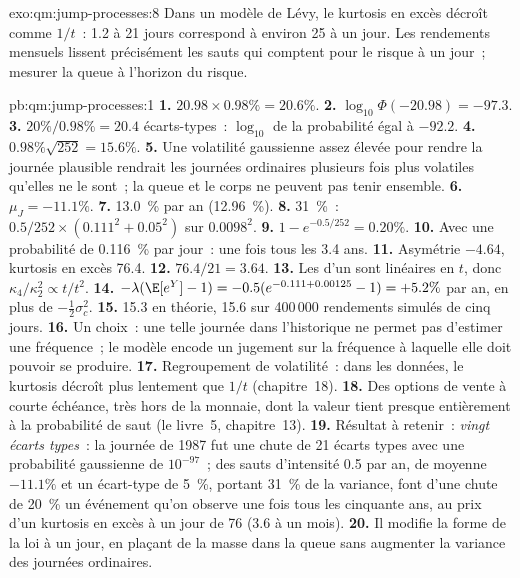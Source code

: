\begin{solution}{exo:qm:jump-processes:8}
Dans un modèle de Lévy, le kurtosis en excès décroît comme $1/t$~: 1.2 à 21 jours correspond à environ 25 à un jour.
Les rendements mensuels lissent précisément les sauts qui comptent pour le risque à un jour~; mesurer la queue à
l'horizon du risque.
\end{solution}

\begin{solution}{pb:qm:jump-processes:1}
\textbf{1.} $20.98 \times 0.98\% = 20.6\%$.
\textbf{2.} $\log_{10}\Phi(-20.98) = -97.3$.
\textbf{3.} $20\%/0.98\% = 20.4$ écarts-types~: $\log_{10}$ de la probabilité égal à $-92.2$.
\textbf{4.} $0.98\%\sqrt{252} = 15.6\%$.
\textbf{5.} Une volatilité gaussienne assez élevée pour rendre la journée plausible rendrait les journées ordinaires
plusieurs fois plus volatiles qu'elles ne le sont~; la queue et le corps ne peuvent pas tenir ensemble.
\textbf{6.} $\mu_J = -11.1\%$.
\textbf{7.} 13.0~\% par an (12.96~\%).
\textbf{8.} 31~\%~: $0.5/252 \times (0.111^2 + 0.05^2)$ sur $0.0098^2$.
\textbf{9.} $1 - e^{-0.5/252} = 0.20\%$.
\textbf{10.} Avec une probabilité de 0.116~\% par jour~: une fois tous les 3.4 ans.
\textbf{11.} Asymétrie $-4.64$, kurtosis en excès 76.4.
\textbf{12.} $76.4/21 = 3.64$.
\textbf{13.} Les  d'un  sont linéaires en $t$, donc $\kappa_4/\kappa_2^2 \propto t/t^2$.
\textbf{14.} $-\lambda(\E[e^Y] - 1) = -0.5(e^{-0.111 + 0.00125} - 1) = +5.2\%$ par an, en plus de $-\tfrac12\sigma_c^2$.
\textbf{15.} 15.3 en théorie, 15.6 sur 400\,000 rendements simulés de cinq jours.
\textbf{16.} Un choix~: une telle journée dans l'historique ne permet pas d'estimer une fréquence~; le modèle encode un
jugement sur la fréquence à laquelle elle doit pouvoir se produire.
\textbf{17.} Regroupement de volatilité~: dans les données, le kurtosis décroît plus lentement que $1/t$ (chapitre~18).
\textbf{18.} Des options de vente à courte échéance, très hors de la monnaie, dont la valeur tient presque entièrement à la probabilité de saut (le
livre~5, chapitre~13).
\textbf{19.} Résultat à retenir~: \emph{vingt écarts types}~: la journée de 1987 fut une chute de 21 écarts types
avec une probabilité gaussienne de $10^{-97}$~; des sauts d'intensité 0.5 par an, de moyenne $-11.1\%$ et un écart-type
de 5~\%, portant 31~\% de la variance, font d'une chute de 20~\% un événement qu'on observe une fois tous les cinquante ans, au
prix d'un kurtosis en excès à un jour de 76 (3.6 à un mois).
\textbf{20.} Il modifie la forme de la loi à un jour, en plaçant de la masse dans la queue sans augmenter la
variance des journées ordinaires.
\end{solution}

